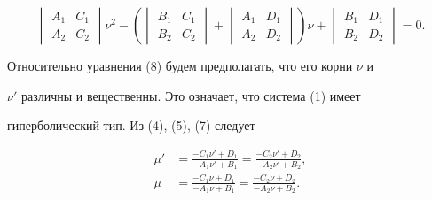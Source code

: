 \begin{equation} 


\begin{vmatrix} 


A_1 & C_1 \\ A_2 & C_2 


\end{vmatrix} 


\nu^2-\left( 


\begin{vmatrix} 


B_1 & C_1 \\ B_2 & C_2 


\end{vmatrix} 


+ 


\begin{vmatrix} 


A_1 & D_1 \\ A_2 & D_2 


\end{vmatrix} 


\right)\nu+ 


\begin{vmatrix} 


B_1 & D_1 \\ B_2 & D_2 


\end{vmatrix} 


=0. 


\end{equation} 


Относительно уравнения (8) будем предполагать, что его корни $\nu$ и 


$\nu'$ различны и вещественны. Это означает, что система (1) имеет 


гиперболический тип. Из (4), (5), (7) следует 


\begin{equation} 


\begin{split} 


\mu'&=\frac{-C_1\nu'+D_1}{-A_1\nu'+B_1} 


=\frac{-C_2\nu'+D_2}{-A_2\nu'+B_2},\\ 


% 


\mu&=\frac{-C_1\nu+D_1}{-A_1\nu+B_1}= 


\frac{-C_2\nu+D_2}{-A_2\nu+B_2}.


\end{split} 


\end{equation} 


